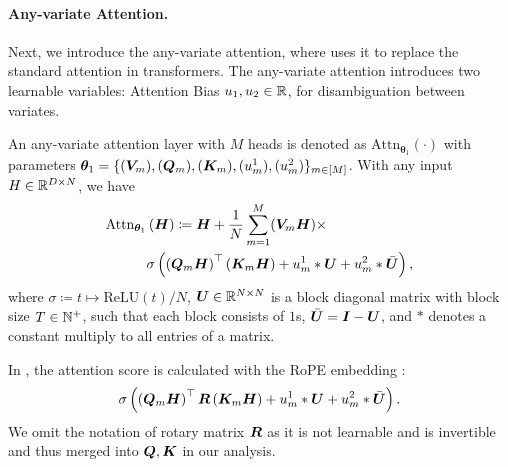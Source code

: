 \paragraph{Any-variate Attention.}
Next, we introduce the any-variate attention, where \cite{woo2024unified} uses it to replace the standard attention in transformers.
The any-variate attention introduces two learnable variables: Attention Bias $u_1, u_2 \in \mathbb{R}$,
for disambiguation between variates.
\begin{definition}\label{def:any-variate-attn}
    An any-variate attention layer with $M$ heads is denoted as $\text{Attn}_{\bm{\theta}_1}(\cdot)$ with parameters $\bm{\theta}_{1} = \{ (\boldsymbol{V}_m), (\boldsymbol{Q}_m), (\boldsymbol{K}_m), (u_m^1), (u_m^2)  \}_{m \in [M]}$.
    With any input $H \in \mathbb{R}^{D \times N}$, we have
    \begin{align*}
    \text{Attn}_{\bm{\theta}_1} &\left( \boldsymbol{H} \right)
    \coloneqq
    \boldsymbol{H} + 
    \frac{1}{N}
    \sum_{m=1}^M
    (\boldsymbol{V}_m \boldsymbol{H})
    \times
    \\
    &\sigma 
    \left( 
    \left( \boldsymbol{Q}_m \boldsymbol{H} \right)^\top 
    \left(\boldsymbol{K}_m \boldsymbol{H} \right) 
    +
    u_m^1 * \bm{U}
    +
    u_m^2 * \bar{\bm{U}}
    \right),  
\end{align*}
where $\sigma \coloneqq t \mapsto \text{ReLU}(t)/N$, $\bm{U} \in \mathbb{R}^{N \times N}$ is a block diagonal matrix with block size $T\in \mathbb{N}^+$, such that each block consists of $1$s, $\bar{\bm{U}} = \bm{I} - \bm{U}$, and $*$ denotes a constant multiply to all entries of a matrix.
\end{definition}

\begin{remark}
    In \cite{woo2024unified}, the attention score is calculated with the RoPE embedding \cite{su2024roformer}:
    \[
    \sigma 
    \left( 
    \left( \boldsymbol{Q}_m \boldsymbol{H} \right)^\top 
    \boldsymbol{R}
    \left(\boldsymbol{K}_m \boldsymbol{H} \right) 
    +
    u_m^1 * \bm{U}
    +
    u_m^2 * \bar{\bm{U}}
    \right).  
    \]
    We omit the notation of rotary matrix $\boldsymbol{R}$ as it is not learnable and is invertible and thus merged into $\boldsymbol{Q}, \boldsymbol{K}$ in our analysis.
\end{remark}

